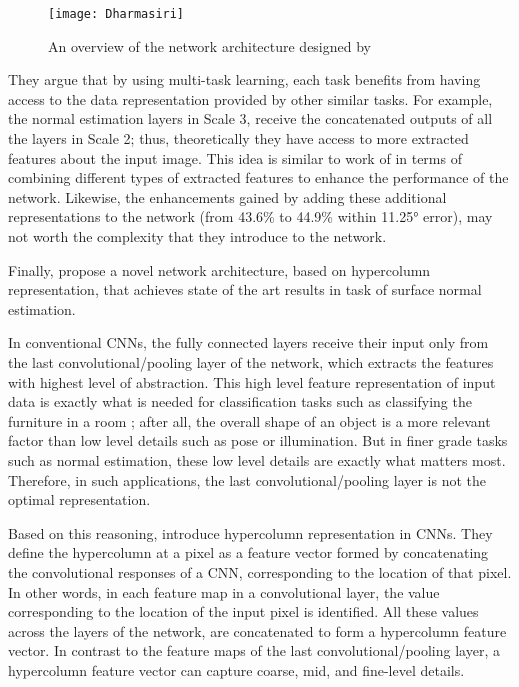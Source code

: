 \begin{wrapfigure}{r}{0.45\textwidth}
    \centering
    \texttt{[image: Dharmasiri]}
    \caption{An overview of the network architecture designed by \citeauthor*{dharmasiri} \cite{dharmasiri}}
    \label{fig:dharmasiri}
\end{wrapfigure}

They argue that by using multi-task learning, each task benefits from having access to the data representation provided by other similar tasks. For example, the normal estimation layers in Scale 3, receive the concatenated outputs of all the layers in Scale 2; thus, theoretically they have access to more extracted features about the input image. This idea is similar to work of \citeauthor*{wang} in terms of combining different types of extracted features to enhance the performance of the network. Likewise, the enhancements gained by adding these additional representations to the network (from 43.6\% to 44.9\% within \ang{11.25} error), may not worth the complexity that they introduce to the network.      

Finally, \citeauthor*{bansal} \cite{bansal} propose a novel network architecture, based on hypercolumn representation, that achieves state of the art results in task of surface normal estimation. 

In conventional CNNs, the fully connected layers receive their input only from the last convolutional/pooling layer of the network, which extracts the features with highest level of abstraction. This high level feature representation of input data is exactly what is needed for classification tasks such as classifying the furniture in a room ; after all, the overall shape of an object is a more relevant factor than low level details such as pose or illumination. But in finer grade tasks such as normal estimation, these low level details are exactly what matters most. Therefore, in such applications, the last convolutional/pooling layer is not the optimal representation. 

Based on this reasoning, \citeauthor*{hariharan} \cite{hariharan} introduce hypercolumn representation in CNNs. They define the hypercolumn at a pixel as a feature vector formed by concatenating the convolutional responses of a CNN, corresponding to the location of that pixel. In other words, in each feature map in a convolutional layer, the value corresponding to the location of the input pixel is identified. All these values across the layers of the network, are concatenated to form a hypercolumn feature vector. In contrast to the feature maps of the last convolutional/pooling layer, a hypercolumn feature vector can capture coarse, mid, and fine-level details. 

